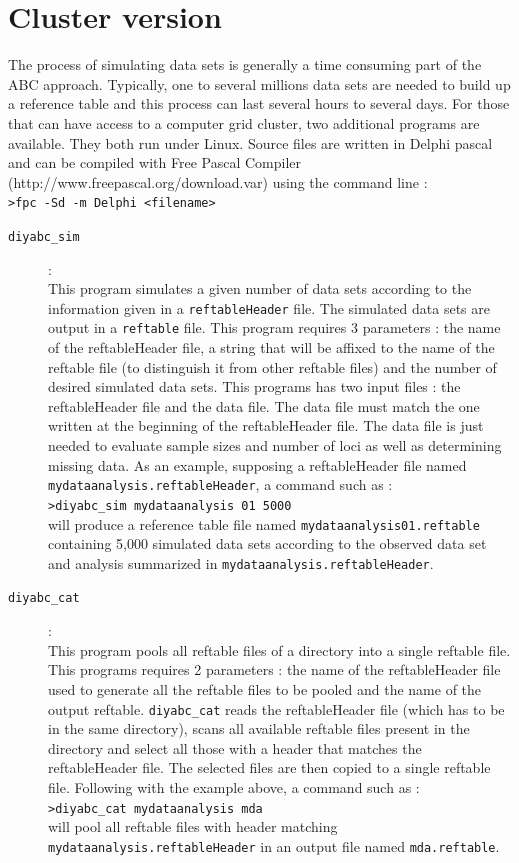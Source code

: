 \section{Cluster version}
The process of simulating data sets is generally a time consuming part of the ABC approach. Typically, one to several millions  data sets are needed to build up a reference table and this process can last several hours to several days. For those  that can have access to a computer grid cluster, two additional programs are available. They both run under Linux. Source files are written in Delphi pascal and can be compiled with Free Pascal Compiler (http://www.freepascal.org/download.var) using the command line :\\
\texttt{>fpc -Sd -m Delphi <filename>}
  \begin{description}
  \item[\texttt{diyabc\_sim}] :\\
  This program simulates a given number of data sets according to the information given in a \texttt{reftableHeader} file. The simulated data sets are output in a \texttt{reftable} file. This program requires 3 parameters : the name of the reftableHeader file, a string that will be affixed to the name of the reftable file (to distinguish it from other reftable files) and the number of desired simulated data sets. This programs has two input files : the reftableHeader file and the data file. The data file must match the one written at the beginning of the reftableHeader file. The data file is just needed to evaluate sample sizes and number of loci as well as determining missing data. As an example, supposing a reftableHeader file named \texttt{mydataanalysis.reftableHeader}, a command such as :\\
  \texttt{>diyabc\_sim mydataanalysis 01 5000}\\
  will produce a reference table file named \texttt{mydataanalysis01.reftable}  containing 5,000 simulated data sets according to the observed data set and analysis summarized in   \texttt{mydataanalysis.reftableHeader}. 
  
  \item[\texttt{diyabc\_cat}]:\\
  This program pools all reftable files of a directory into a single reftable file. This programs requires 2 parameters : the name of the reftableHeader file used to generate all the reftable files to be pooled and the name of the output reftable. \texttt{diyabc\_cat} reads the reftableHeader file (which has to be in the same directory), scans all available reftable files present in the directory and select all those with a header that matches the reftableHeader file.  The selected files are then copied to a single reftable file. Following with the example above, a command such as :\\
  \texttt{>diyabc\_cat mydataanalysis mda}\\
  will pool all reftable files with header matching \texttt{mydataanalysis.reftableHeader} in an output file named \texttt{mda.reftable}. 
  \end{description}
  
